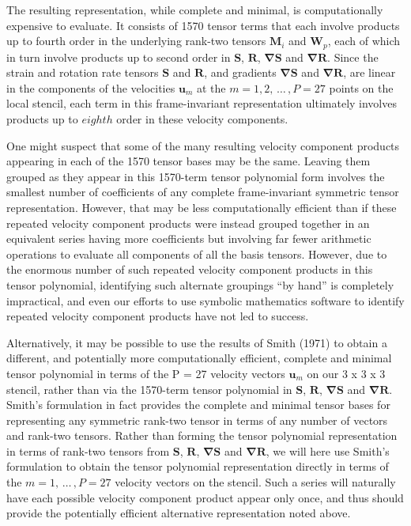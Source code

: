 The resulting representation, while complete and minimal, is computationally expensive to evaluate.  It consists of 1570 tensor terms that each involve products up to fourth order in the underlying rank-two tensors $\mathbf{M}_i$ and $\mathbf{W}_p$, each of which in turn involve products up to second order in $\mathbf{S}$, $\mathbf{R}$, $\mathbf{\nabla S}$ and $\mathbf{\nabla R}$. Since the strain and rotation rate tensors $\mathbf{S}$ and $\mathbf{R}$, and gradients $\mathbf{\nabla S}$ and $\mathbf{\nabla R}$, are linear in the components of the velocities $\mathbf{u}_m$  at the $m = 1, 2, \,\dots\, , P = 27$ points on the local  stencil, each term in this frame-invariant representation ultimately involves products up to $eighth$ order in these velocity components.  

One might suspect that some of the many resulting velocity component products appearing in each of the 1570 tensor bases may be the same. Leaving them grouped as they appear in this 1570-term tensor polynomial form involves the smallest number of coefficients of any complete frame-invariant symmetric tensor representation. However, that may be less computationally efficient than if these repeated velocity component products were instead grouped together in an equivalent series having more coefficients but involving far fewer arithmetic operations to evaluate all components of all the basis tensors. However, due to the enormous number of such repeated velocity component products in this tensor polynomial, identifying such alternate groupings “by hand” is completely impractical, and even our efforts to use symbolic mathematics software to identify repeated velocity component products have not led to success.

Alternatively, it may be possible to use the results of Smith (1971) to obtain a different, and potentially more computationally efficient, complete and minimal tensor polynomial in terms of the P = 27 velocity vectors $\mathbf{u}_m$ on our 3 x 3 x 3   stencil, rather than via the 1570-term tensor polynomial in $\mathbf{S}$, $\mathbf{R}$, $\mathbf{\nabla S}$ and $\mathbf{\nabla R}$. Smith’s formulation in fact provides the complete and minimal tensor bases for representing any symmetric rank-two tensor in terms of any number of vectors and rank-two tensors.  Rather than forming the tensor polynomial representation in terms of rank-two tensors from $\mathbf{S}$, $\mathbf{R}$, $\mathbf{\nabla S}$ and $\mathbf{\nabla R}$, we will here use Smith’s formulation to obtain the tensor polynomial representation directly in terms of the $m = 1, \,\dots\, , P = 27$ velocity vectors   on the stencil.  Such a series will naturally have each possible velocity component product appear only once, and thus should provide the potentially efficient alternative representation noted above.

